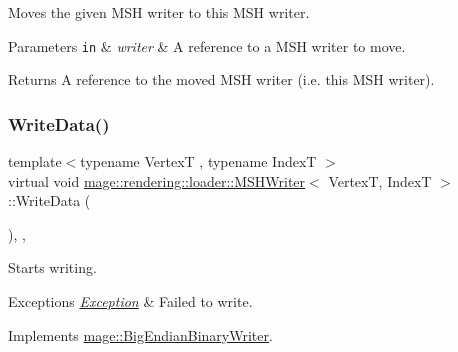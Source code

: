 Moves the given M\+SH writer to this M\+SH writer.


\begin{DoxyParams}[1]{Parameters}
\mbox{\tt in}  & {\em writer} & A reference to a M\+SH writer to move. \\
\hline
\end{DoxyParams}
\begin{DoxyReturn}{Returns}
A reference to the moved M\+SH writer (i.\+e. this M\+SH writer). 
\end{DoxyReturn}
\mbox{\label{classmage_1_1rendering_1_1loader_1_1_m_s_h_writer_ad61ee7097e1bfb52ca9a0697d2cd6a7e}} 
\subsubsection{\texorpdfstring{Write\+Data()}{WriteData()}}
{\footnotesize\ttfamily template$<$typename VertexT , typename IndexT $>$ \\
virtual void \mbox{\hyperlink{classmage_1_1rendering_1_1loader_1_1_m_s_h_writer}{mage\+::rendering\+::loader\+::\+M\+S\+H\+Writer}}$<$ VertexT, IndexT $>$\+::Write\+Data (\begin{DoxyParamCaption}{ }\end{DoxyParamCaption})\hspace{0.3cm}{\ttfamily [override]}, {\ttfamily [private]}, {\ttfamily [virtual]}}

Starts writing.


\begin{DoxyExceptions}{Exceptions}
{\em \mbox{\hyperlink{classmage_1_1_exception}{Exception}}} & Failed to write. \\
\hline
\end{DoxyExceptions}


Implements \mbox{\hyperlink{classmage_1_1_big_endian_binary_writer_a719581274b1b185ef05687183f7ded25}{mage\+::\+Big\+Endian\+Binary\+Writer}}.

\mbox{\label{classmage_1_1rendering_1_1loader_1_1_m_s_h_writer_a3a49f78f308a0827f4a99150ad49d7c1}} 

